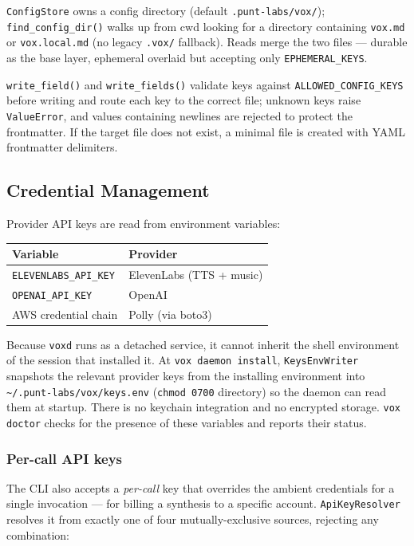 \documentclass[a4paper,10pt]{article}
\begin{document}
\texttt{ConfigStore} owns a config directory (default
\texttt{.punt-labs/vox/}); \texttt{find\_config\_dir()} walks up from
cwd looking for a directory containing \texttt{vox.md} or
\texttt{vox.local.md} (no legacy \texttt{.vox/} fallback).  Reads merge
the two files --- durable as the base layer, ephemeral overlaid but
accepting only \texttt{EPHEMERAL\_KEYS}.

\texttt{write\_field()} and \texttt{write\_fields()} validate keys
against \texttt{ALLOWED\_CONFIG\_KEYS} before writing and route each key
to the correct file; unknown keys raise \texttt{ValueError}, and values
containing newlines are rejected to protect the frontmatter.  If the
target file does not exist, a minimal file is created with YAML
frontmatter delimiters.

\subsection{Credential Management}

Provider API keys are read from environment variables:

\begin{center}
\begin{tabular}{ll}
\toprule
\textbf{Variable} & \textbf{Provider} \\
\midrule
\texttt{ELEVENLABS\_API\_KEY} & ElevenLabs (TTS + music) \\
\texttt{OPENAI\_API\_KEY}     & OpenAI \\
AWS credential chain           & Polly (via boto3) \\
\bottomrule
\end{tabular}
\end{center}

Because \texttt{voxd} runs as a detached service, it cannot inherit the
shell environment of the session that installed it.  At \texttt{vox
daemon install}, \texttt{KeysEnvWriter} snapshots the relevant provider
keys from the installing environment into
\texttt{\~{}/.punt-labs/vox/keys.env} (\texttt{chmod 0700} directory) so
the daemon can read them at startup.  There is no keychain integration
and no encrypted storage.  \texttt{vox doctor} checks for the presence
of these variables and reports their status.

\subsubsection*{Per-call API keys}

The CLI also accepts a \emph{per-call} key that overrides the ambient
credentials for a single invocation --- for billing a synthesis to a
specific account.  \texttt{ApiKeyResolver} resolves it from exactly one
of four mutually-exclusive sources, rejecting any combination:
\end{document}

